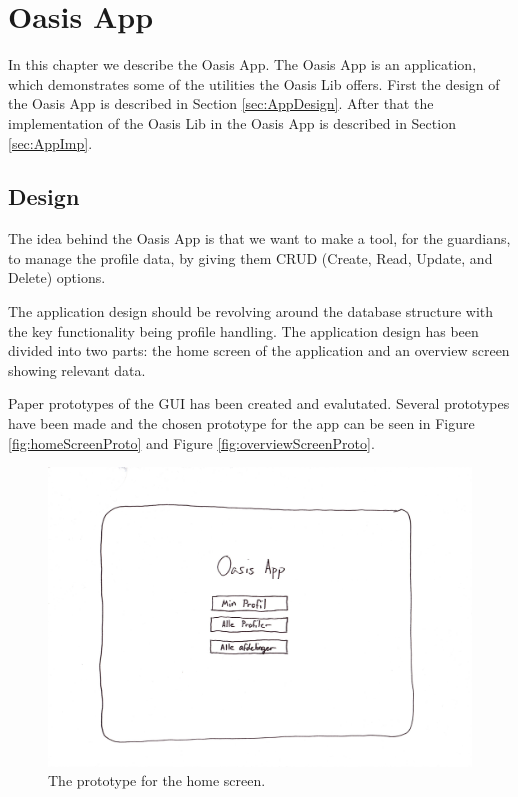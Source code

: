 \chapter{Oasis App}
\label{ch:App}
In this chapter we describe the Oasis App. The Oasis App is an application, which demonstrates some of the utilities the Oasis Lib offers. First the design of the Oasis App is described in Section \vref{sec:AppDesign}. After that the implementation of the Oasis Lib in the Oasis App is described in Section \vref{sec:AppImp}.

\section{Design}
\label{sec:AppDesign}
The idea behind the Oasis App is that we want to make a tool, for the guardians, to manage the profile data, by giving them CRUD (Create, Read, Update, and Delete) options.

The application design should be revolving around the database structure with the key functionality being profile handling.
The application design has been divided into two parts: the home screen of the application and an overview screen showing relevant data.

Paper prototypes of the GUI has been created and evalutated.
Several prototypes have been made and the chosen prototype for the app can be seen in Figure \vref{fig:homeScreenProto} and Figure \vref{fig:overviewScreenProto}.

\begin{figure}[htbp]
	\centering
		\includegraphics[width=\textwidth]{Images/homeScreenPrototype}
	\caption{The prototype for the home screen.}
	\label{fig:homeScreenProto}
\end{figure}

